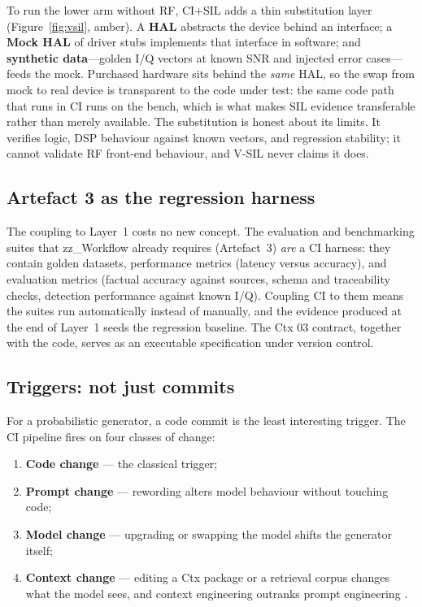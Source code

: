\documentclass[11pt,a4paper]{article}
\begin{document}
To run the lower arm without RF, CI+SIL adds a thin substitution layer (Figure~\ref{fig:vsil},
amber). A \textbf{HAL} abstracts the device behind an interface; a \textbf{Mock HAL} of driver
stubs implements that interface in software; and \textbf{synthetic data}---golden I/Q vectors at
known SNR and injected error cases---feeds the mock. Purchased hardware sits behind the
\emph{same} HAL, so the swap from mock to real device is transparent to the code under test:
the same code path that runs in CI runs on the bench, which is what makes SIL evidence
transferable rather than merely available. The substitution is honest about its limits. It
verifies logic, DSP behaviour against known vectors, and regression stability; it cannot
validate RF front-end behaviour, and V-SIL never claims it does.

\subsection{Artefact 3 as the regression harness}
\label{sec:artefact3}

The coupling to Layer~1 costs no new concept. The evaluation and benchmarking suites that
zz\_Workflow already requires (Artefact~3) \emph{are} a CI harness: they contain golden datasets,
performance metrics (latency versus accuracy), and evaluation metrics (factual accuracy against
sources, schema and traceability checks, detection performance against known I/Q). Coupling CI
to them means the suites run automatically instead of manually, and the evidence produced at the
end of Layer~1 seeds the regression baseline. The Ctx 03 contract, together with the code, serves
as an executable specification under version control.

\subsection{Triggers: not just commits}
\label{sec:triggers}

For a probabilistic generator, a code commit is the least interesting trigger. The CI pipeline
fires on four classes of change:

\begin{enumerate}
  \item \textbf{Code change} --- the classical trigger;
  \item \textbf{Prompt change} --- rewording alters model behaviour without touching code;
  \item \textbf{Model change} --- upgrading or swapping the model shifts the generator itself;
  \item \textbf{Context change} --- editing a Ctx package or a retrieval corpus changes what the
    model sees, and context engineering outranks prompt engineering \cite{anthropic2026}.
\end{enumerate}
\end{document}
